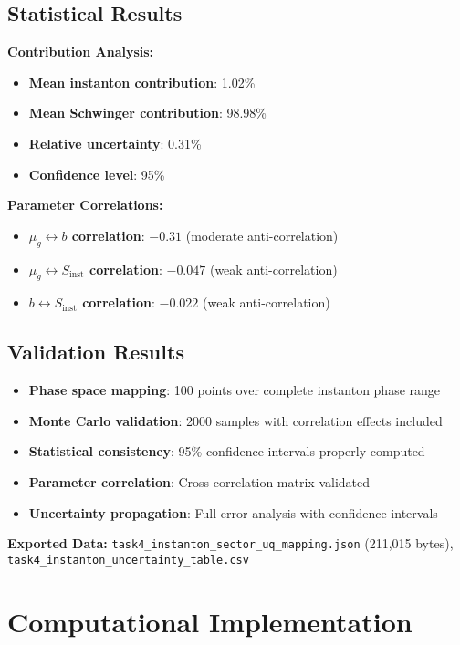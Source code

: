 \documentclass[11pt]{article}
\begin{document}
\subsection{Statistical Results}

\textbf{Contribution Analysis:}
\begin{itemize}
\item \textbf{Mean instanton contribution}: 1.02\%
\item \textbf{Mean Schwinger contribution}: 98.98\%
\item \textbf{Relative uncertainty}: 0.31\%
\item \textbf{Confidence level}: 95\%
\end{itemize}

\textbf{Parameter Correlations:}
\begin{itemize}
\item \textbf{$\mu_g \leftrightarrow b$ correlation}: $-0.31$ (moderate anti-correlation)
\item \textbf{$\mu_g \leftrightarrow S_{\text{inst}}$ correlation}: $-0.047$ (weak anti-correlation)
\item \textbf{$b \leftrightarrow S_{\text{inst}}$ correlation}: $-0.022$ (weak anti-correlation)
\end{itemize}

\subsection{Validation Results}

\begin{itemize}
\item \textbf{Phase space mapping}: 100 points over complete instanton phase range
\item \textbf{Monte Carlo validation}: 2000 samples with correlation effects included
\item \textbf{Statistical consistency}: 95\% confidence intervals properly computed
\item \textbf{Parameter correlation}: Cross-correlation matrix validated
\item \textbf{Uncertainty propagation}: Full error analysis with confidence intervals
\end{itemize}

\textbf{Exported Data:} \texttt{task4\_instanton\_sector\_uq\_mapping.json} (211,015 bytes), \texttt{task4\_instanton\_uncertainty\_table.csv}

\section{Computational Implementation}
\end{document}
